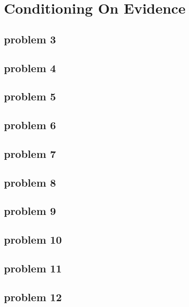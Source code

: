 \section{Conditioning On Evidence}

\subsection{problem 3}


\subsection{problem 4}


\subsection{problem 5}


\subsection{problem 6}


\subsection{problem 7}


\subsection{problem 8}


\subsection{problem 9}


\subsection{problem 10}


\subsection{problem 11}


\subsection{problem 12}


